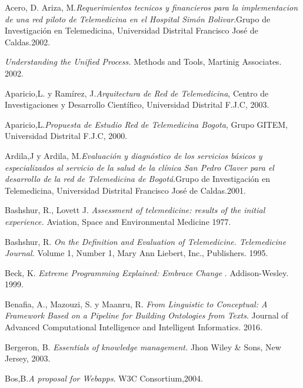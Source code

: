 \begin{thebibliography}{}

 Acero, D. Ariza, M.\textit{Requerimientos tecnicos y financieros para la implementacion de una red piloto de Telemedicina en el Hospital Simón Bolivar}.Grupo de Investigación en Telemedicina,  Universidad Distrital Francisco José de Caldas.2002.

 \textit{Understanding the Unified Process.} Methods and Tools, Martinig Associates. 2002.

 Aparicio,L. y Ramírez, J.\textit{Arquitectura de Red de Telemedicina}, Centro de Investigaciones y Desarrollo Científico, Universidad Distrital F.J.C, 2003.

 Aparicio,L.\textit{Propuesta de Estudio Red de Telemedicina Bogota}, Grupo GITEM, Universidad Distrital F.J.C, 2000.

 Ardila,J y Ardila, M.\textit{Evaluación y diagnóstico de los servicios básicos y especializados al servicio de la salud de la clínica San Pedro Claver para el desarrollo de la red de Telemedicina de Bogotá}.Grupo de Investigación en Telemedicina,  Universidad Distrital Francisco José de Caldas.2001.


 Bashshur, R., Lovett J. \textit{Assessment of telemedicine: results of the initial experience.} Aviation, Space and Environmental Medicine 1977.

 Bashshur, R. \textit{On the Definition and Evaluation of Telemedicine. Telemedicine Journal.} Volume 1, Number 1, Mary Ann Liebert, Inc., Publishers. 1995.

 Beck, K. \textit{ Extreme Programming Explained: Embrace Change }. Addison-Wesley. 1999.

 Benafia, A., Mazouzi, S. y Maanru, R. \textit{From Linguistic to Conceptual: A Framework Based on a Pipeline for Building Ontologies from Texts}. Journal of Advanced Computational Intelligence and Intelligent Informatics. 2016.

 Bergeron, B. \textit{Essentials of knowledge management.} Jhon Wiley \& Sons, New Jersey, 2003.

 Bos,B.\textit{A proposal for Webapps}. W3C Consortium,2004.


\end{thebibliography}
